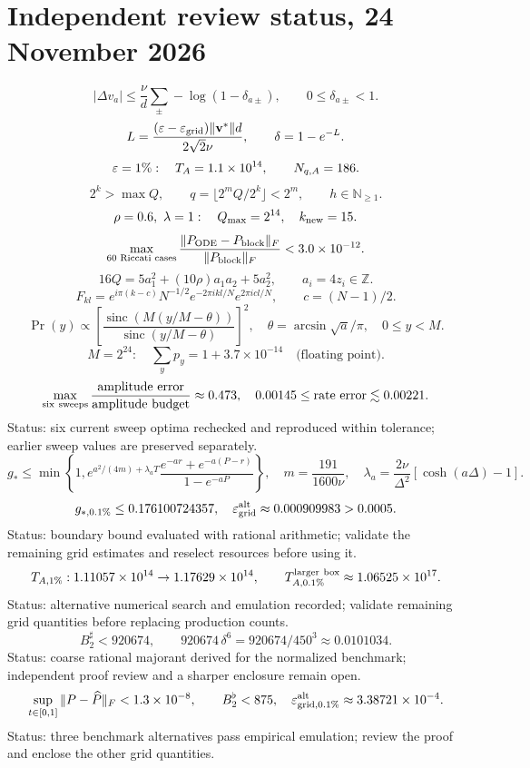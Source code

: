 \documentclass[11pt,a4paper]{article}
\begin{document}
\section*{Independent review status, 24 November 2026}
\[
 |\Delta v_a|\le\frac{\nu}{d}\sum_{\pm}-\log(1-\delta_{a\pm}),
 \qquad 0\le\delta_{a\pm}<1.
\]
\[
 L=\frac{(\varepsilon-\varepsilon_{\rm grid})\|\mathbf v^*\|d}{2\sqrt2\nu},
 \qquad \delta=1-e^{-L}.
\]
\[
 \varepsilon=1\%:\quad T_A=1.1\times10^{14},\qquad N_{q,A}=186.
\]
\[
 2^k>\max Q,\qquad q=\lfloor 2^mQ/2^k\rfloor<2^m,\qquad h\in\mathbb N_{\ge1}.
\]
\[
 \rho=0.6,\ \lambda=1:\quad Q_{\max}=2^{14},\quad k_{\rm new}=15.
\]
\[
 \max_{\text{60 Riccati cases}}\frac{\|P_{\rm ODE}-P_{\rm block}\|_F}{\|P_{\rm block}\|_F}
 <3.0\times10^{-12}.
\]
\[
 16Q=5a_1^2+(10\rho)a_1a_2+5a_2^2,\qquad a_i=4z_i\in\mathbb Z.
\]
\[
 F_{kl}=e^{i\pi(k-c)}N^{-1/2}e^{-2\pi ikl/N}e^{2\pi icl/N},
 \qquad c=(N-1)/2.
\]
\[
 \Pr(y)\propto\left[\frac{\operatorname{sinc}(M(y/M-\theta))}
 {\operatorname{sinc}(y/M-\theta)}\right]^2,\quad
 \theta=\arcsin\sqrt a/\pi,\quad 0\le y<M.
\]
\[
 M=2^{24}:\quad \sum_y p_y=1+3.7\times10^{-14}\quad\text{(floating point)}.
\]
\[
 \max_{\rm six\ sweeps}\frac{\text{amplitude error}}{\text{amplitude budget}}
 \approx0.473,\quad 0.00145\le\text{rate error}\lesssim0.00221.
\]
Status: six current sweep optima rechecked and reproduced within tolerance; earlier sweep values are preserved separately.
\[
 g_*\le\min\!\left\{1,e^{a^2/(4m)+\lambda_a T}
 \frac{e^{-ar}+e^{-a(P-r)}}{1-e^{-aP}}\right\},\quad
 m=\frac{191}{1600\nu},\quad
 \lambda_a=\frac{2\nu}{\Delta^2}[\cosh(a\Delta)-1].
\]
\[
 g_{*,0.1\%}\le0.176100724357,\quad
 \varepsilon_{\rm grid}^{\rm alt}\approx0.000909983>0.0005.
\]
Status: boundary bound evaluated with rational arithmetic; validate the remaining grid estimates and reselect resources before using it.
\[
 T_{A,1\%}:1.11057\times10^{14}\to1.17629\times10^{14},\qquad
 T_{A,0.1\%}^{\rm larger\ box}\approx1.06525\times10^{17}.
\]
Status: alternative numerical search and emulation recorded; validate remaining grid quantities before replacing production counts.
\[
 B_2^{\sharp}<920674,\qquad
 920674\,\delta^6=920674/450^3\approx0.0101034.
\]
Status: coarse rational majorant derived for the normalized benchmark; independent proof review and a sharper enclosure remain open.
\[
 \sup_{t\in[0,1]}\|P-\widehat P\|_F<1.3\times10^{-8},\qquad
 B_2^{\flat}<875,\quad \varepsilon_{\rm grid,0.1\%}^{\rm alt}\approx3.38721\times10^{-4}.
\]
Status: three benchmark alternatives pass empirical emulation; review the proof and enclose the other grid quantities.
\end{document}

